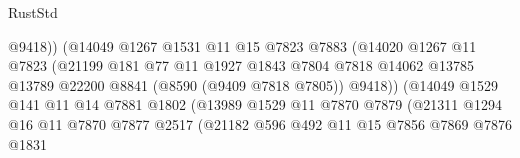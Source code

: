 \begin{lexlean}{RustStd}
\begin{coremodule}
                                        @9418))
                                    (@14049
                                      @1267
                                      @1531
                                      @11
                                      @15
                                      @7823
                                      @7883
                                      (@14020
                                        @1267
                                        @11
                                        @7823
                                        (@21199
                                          @181
                                          @77
                                          @11
                                          @1927
                                          @1843
                                          @7804
                                          @7818
                                          @14062
                                          @13785
                                          @13789
                                          @22200
                                          @8841
                                          (@8590 (@9409 @7818 @7805))
                                          @9418))
                                      (@14049
                                        @1529
                                        @141
                                        @11
                                        @14
                                        @7881
                                        @1802
                                        (@13989
                                          @1529
                                          @11
                                          @7870
                                          @7879
                                          (@21311
                                            @1294
                                            @16
                                            @11
                                            @7870
                                            @7877
                                            @2517
                                            (@21182
                                              @596
                                              @492
                                              @11
                                              @15
                                              @7856
                                              @7869
                                              @7876
                                              @1831

\end{coremodule}
\end{lexlean}
